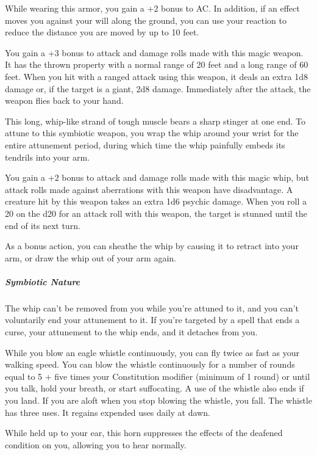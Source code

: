 \documentclass[10pt,a4paper,twoside,bg=print,twocolumn,openany,nodeprecatedcode]{dndbook}
\begin{document}
While wearing this armor, you gain a +2 bonus to AC. In addition, if an effect moves you against your will along the ground, you can use your reaction to reduce the distance you are moved by up to 10 feet.

You gain a +3 bonus to attack and damage rolls made with this magic weapon. It has the thrown property with a normal range of 20 feet and a long range of 60 feet. When you hit with a ranged attack using this weapon, it deals an extra 1d8 damage or, if the target is a giant, 2d8 damage. Immediately after the attack, the weapon flies back to your hand.

This long, whip-like strand of tough muscle bears a sharp stinger at one end. To attune to this symbiotic weapon, you wrap the whip around your wrist for the entire attunement period, during which time the whip painfully embeds its tendrils into your arm.

You gain a +2 bonus to attack and damage rolls made with this magic whip, but attack rolls made against aberrations with this weapon have disadvantage. A creature hit by this weapon takes an extra 1d6 psychic damage. When you roll a 20 on the d20 for an attack roll with this weapon, the target is stunned until the end of its next turn.

As a bonus action, you can sheathe the whip by causing it to retract into your arm, or draw the whip out of your arm again.

\subparagraph{Symbiotic Nature}
The whip can't be removed from you while you're attuned to it, and you can't voluntarily end your attunement to it. If you're targeted by a spell that ends a curse, your attunement to the whip ends, and it detaches from you.

While you blow an eagle whistle continuously, you can fly twice as fast as your walking speed. You can blow the whistle continuously for a number of rounds equal to 5 + five times your Constitution modifier (minimum of 1 round) or until you talk, hold your breath, or start suffocating. A use of the whistle also ends if you land. If you are aloft when you stop blowing the whistle, you fall. The whistle has three uses. It regains expended uses daily at dawn.

While held up to your ear, this horn suppresses the effects of the deafened condition on you, allowing you to hear normally.
\end{document}
